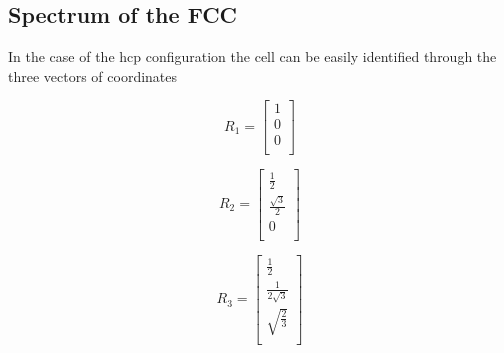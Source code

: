 \documentclass[a4paper]{article}
\begin{document}
\subsection{Spectrum of the FCC}

In the case of the hcp configuration the cell can be easily identified through the three vectors of coordinates\\
\begin{minipage}{0.3\textwidth}
\centering
\begin{equation*}
R_1 =
\begin{bmatrix}
	1 \\
    0 \\
    0 \\
    
\end{bmatrix}
\end{equation*}

\end{minipage}
\begin{minipage}{0.3\textwidth}
\centering
\begin{equation*}
R_2 =
\begin{bmatrix}
    \frac{1}{2} \\
    \frac{\sqrt{3}}{2}  \\
    0 \\
\end{bmatrix}
\end{equation*}
\end{minipage}
\begin{minipage}{0.3\textwidth}
\centering
\begin{equation*}
R_3 =
\begin{bmatrix}
    \frac{1}{2} \\
    \frac{1}{2\sqrt{3}}  \\
    \sqrt{\frac{2}{3}} \\
\end{bmatrix}
\end{equation*}
\end{minipage}
\end{document}
